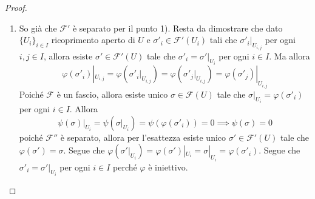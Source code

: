 \begin{proof}{}
\begin{enumerate}[label = \arabic*)]
        Infine poiché \(\mathcal{F}\) è fascio, esiste unico \(\sigma' \in
        \mathcal{F}'{(U)}\) tale che \(\sigma'_i = \sigma'|_{U_{i}} \) per ogni
        \(i \in I\). Allora
        \[
          \varphi {(\sigma)}|_{U_{i}} =\varphi {(\sigma'|_{U_{i}} )} = \varphi {(\sigma'_i)} =
          \sigma|_{U_{i}} \implies \varphi {(\sigma')} = \sigma
        \]
        perché \(\mathcal{F}\) è separato, da cui \(\sigma'' = \psi{(\sigma)} =
        \psi{(\varphi {(\sigma')})} = 0\) 
    \item So già che \(\mathcal{F}'\) è separato per il punto 1). Resta da
        dimostrare che dato \(\{U_{i}\} _{i \in I} \) ricoprimento aperto di
        \(U\) e \(\sigma'_i \in \mathcal{F}'{(U_{i})}\) tali che
        \(\sigma'_i|_{U_{i,j}} \) per ogni \(i , j \in I\), allora esiste
        \(\sigma' \in \mathcal{F}'{(U)}\) tale che \(\sigma'_i =
        \sigma'|_{U_{i}} \) per ogni \(i \in I\). Ma allora
        \[
          \varphi {(\sigma'_i)}|_{U_{i,j}} = \varphi {(\sigma'_i|_{U_{i,j}} )} =
          \varphi {(\sigma'_j|_{U_{i,j}} )} = \varphi {(\sigma'_j)}|_{U_{i,j}} 
        \]
        Poiché \(\mathcal{F}\) è un fascio, allora esiste unico \(\sigma \in
        \mathcal{F}{(U)}\) tale che \(\sigma|_{U_{i}} = \varphi {(\sigma'_i)}\)
        per ogni \( i \in I\). Allora
        \[
          \psi {(\sigma)}|_{U_{i}} = \psi {(\sigma|_{U_{i}} )} =
          \psi{(\varphi {(\sigma'_i)})} = 0 \implies \psi{(\sigma)} = 0
        \]
        poiché \(\mathcal{F}''\) è separato, allora per l'esattezza esiste unico
        \(\sigma' \in \mathcal{F}'{(U)}\) tale che \(\varphi {(\sigma')} =
        \sigma\). Segue che \(\varphi {(\sigma'|_{U_{i}} )} = \varphi
        {(\sigma')}|_{U_{i}} = \sigma|_{U_{i}}  = \varphi {(\sigma'_i)}\). Segue
        che \(\sigma'_i = \sigma'|_{U_{i}} \) per ogni \(i \in I\) perché
        \(\varphi \) è iniettivo.
\end{enumerate}
\end{proof}

